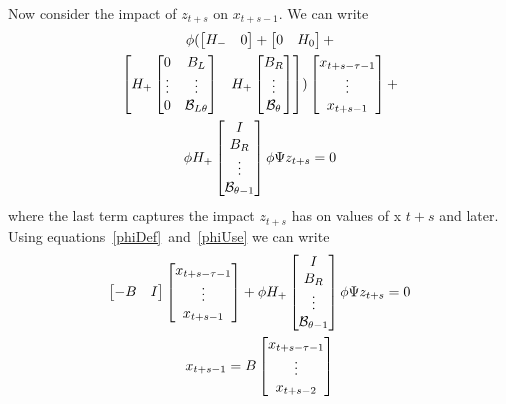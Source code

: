 \documentclass{elsart}
\begin{document}
\begin{prf}
Now consider the impact of $z_{t+s}$ on $x_{t+s-1}$.
We can write
\begin{multline*}
\phi   (\begin{bmatrix}
H_-&0
  \end{bmatrix} + 
  \begin{bmatrix}
    0&H_0
  \end{bmatrix} + \\
  \begin{bmatrix}
    H_+ \begin{bmatrix}
    0&B_L\\\vdots&\vdots\\0&\mathcal{B}_{L\theta}
  \end{bmatrix}& H_+\begin{bmatrix}
    B_R\\\vdots\\\mathcal{B}_{\theta}
  \end{bmatrix}
  \end{bmatrix})  \begin{bmatrix}
    x_{t+s-\tau-1}\\\vdots\\x_{t+s-1}
  \end{bmatrix}+ \\ \phi H_+\begin{bmatrix}
I\\B_R\\\vdots\\\mathcal{B}_{\theta-1}
  \end{bmatrix} \phi \Psi z_{t+s}=0
\end{multline*}
where the last term captures the impact $z_{t+s}$ has on values of x $t+s$
and later.
Using equations~\ref{phiDef}~and~\ref{phiUse} we can write 
\begin{gather}
    \begin{bmatrix}
    -B&I
  \end{bmatrix}
\begin{bmatrix}
    x_{t+s-\tau-1}\\\vdots\\x_{t+s-1}
  \end{bmatrix}+  \phi H_+\begin{bmatrix}
I\\B_R\\\vdots\\\mathcal{B}_{\theta-1}
  \end{bmatrix} \phi\Psi z_{t+s}=0\\
x_{t+s-1} = B \begin{bmatrix}
    x_{t+s-\tau-1}\\\vdots\\x_{t+s-2} 

\end{bmatrix}
\end{gather}
\end{prf}
\end{document}
